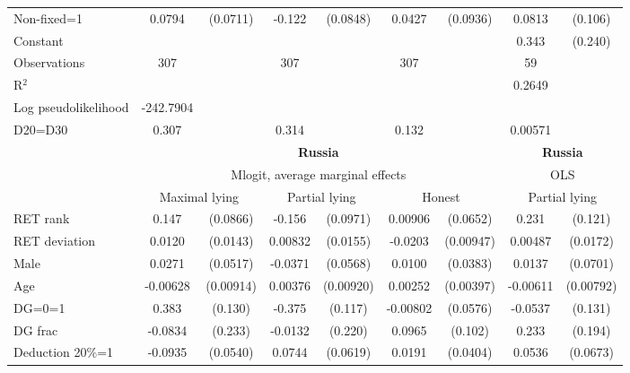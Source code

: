 \begin{tabular}{l|cccccc|cc}
Non-fixed=1     &   0.0794         & (0.0711)&   -0.122         & (0.0848)&   0.0427         & (0.0936)&   0.0813         &  (0.106)\\
Constant        &                  &         &                  &         &                  &         &    0.343         &  (0.240)\\
\hline
Observations    &      307         &         &      307         &         &      307         &         &       59         &         \\
R$^2$      &                  &         &                  &         &                  &         &         0.2649  &   \\ 
Log pseudolikelihood  & -242.7904   &         &                  &         &                  &         &           &   \\ 
D20=D30         &    0.307         &         &    0.314         &         &    0.132         &         &  0.00571         &         \\
\hline\hline
&\multicolumn{6}{c|}{\bf Russia}&\multicolumn{2}{c}{\bf Russia}\\ &\multicolumn{6}{c|}{Mlogit, average marginal effects }&\multicolumn{2}{c}{OLS}\\
                &\multicolumn{2}{c}{Maximal lying}&\multicolumn{2}{c}{Partial lying}&\multicolumn{2}{c}{Honest}  &\multicolumn{2}{c}{Partial lying}\\
\hline
RET rank        &    0.147\sym{*}  & (0.0866)&   -0.156         & (0.0971)&  0.00906         & (0.0652)&    0.231\sym{*}  &  (0.121)\\
RET deviation   &   0.0120         & (0.0143)&  0.00832         & (0.0155)&  -0.0203\sym{**} &(0.00947)&  0.00487         & (0.0172)\\
Male            &   0.0271         & (0.0517)&  -0.0371         & (0.0568)&   0.0100         & (0.0383)&   0.0137         & (0.0701)\\
Age             & -0.00628         &(0.00914)&  0.00376         &(0.00920)&  0.00252         &(0.00397)& -0.00611         &(0.00792)\\
DG=0=1          &    0.383\sym{***}&  (0.130)&   -0.375\sym{***}&  (0.117)& -0.00802         & (0.0576)&  -0.0537         &  (0.131)\\
DG frac         &  -0.0834         &  (0.233)&  -0.0132         &  (0.220)&   0.0965         &  (0.102)&    0.233         &  (0.194)\\
Deduction 20\%=1&  -0.0935\sym{*}  & (0.0540)&   0.0744         & (0.0619)&   0.0191         & (0.0404)&   0.0536         & (0.0673)\\

\end{tabular}
